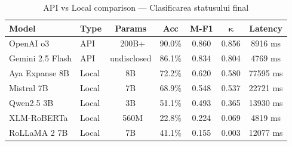 \begin{table}[H]
\centering
\footnotesize
\caption{API vs Local comparison — Clasificarea statusului final}
\label{tab:api-vs-local-final-status-classification}
\begin{tabular}{llccccc}
\toprule
\textbf{Model} & \textbf{Type} & \textbf{Params} & \textbf{Acc} & \textbf{M-F1} & $\boldsymbol{\kappa}$ & \textbf{Latency} \\
\midrule
OpenAI o3 & API & ~200B+ & 90.0\% & 0.860 & 0.856 & 8916 ms \\
Gemini 2.5 Flash & API & undisclosed & 86.1\% & 0.834 & 0.804 & 4769 ms \\
Aya Expanse 8B & Local & 8B & 72.2\% & 0.620 & 0.580 & 77595 ms \\
Mistral 7B & Local & 7B & 68.9\% & 0.548 & 0.537 & 22721 ms \\
Qwen2.5 3B & Local & 3B & 51.1\% & 0.493 & 0.365 & 13930 ms \\
XLM-RoBERTa & Local & ~560M & 22.8\% & 0.224 & 0.069 & 4819 ms \\
RoLLaMA 2 7B & Local & 7B & 41.1\% & 0.155 & 0.003 & 12077 ms \\
\bottomrule
\end{tabular}
\end{table}